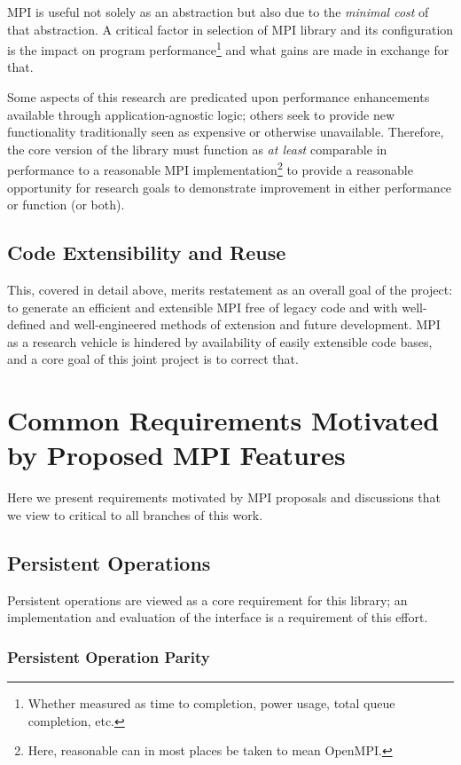 \documentclass{article}
\begin{document}
MPI is useful not solely as an abstraction but also due to the \emph{minimal cost} of that abstraction.  A critical factor in selection of MPI library and its configuration is the impact on program performance\footnote{Whether measured as time to completion, power usage, total queue completion, etc.} and what gains are made in exchange for that.  

Some aspects of this research are predicated upon performance enhancements available through application-agnostic logic; others seek to provide new functionality traditionally seen as expensive or otherwise unavailable.  Therefore, the core version of the library must function as \emph{at least} comparable in performance to a reasonable MPI implementation\footnote{Here, reasonable can in most places be taken to mean OpenMPI.} to provide a reasonable opportunity for research goals to demonstrate improvement in either performance or function (or both).

\subsection{Code Extensibility and Reuse}

This, covered in detail above, merits restatement as an overall goal of the project:  to generate an efficient and extensible MPI free of legacy code and with well-defined and well-engineered methods of extension and future development.  MPI as a research vehicle is hindered by availability of easily extensible code bases, and a core goal of this joint project is to correct that.

\section{Common Requirements Motivated by Proposed MPI Features}

Here we present requirements motivated by MPI proposals and discussions that we view to critical to all branches of this work.

\subsection{Persistent Operations}

Persistent operations are viewed as a core requirement for this library; an implementation and evaluation of the interface is a requirement of this effort.

\subsubsection{Persistent Operation Parity}
\end{document}
